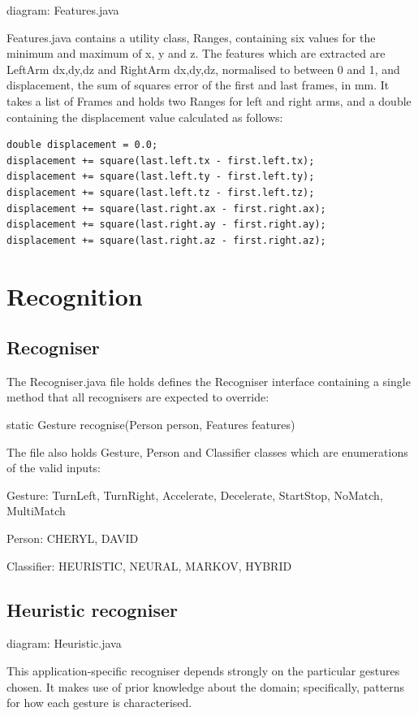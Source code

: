 \documentclass[12pt,a4,notitlepage]{report}
\renewcommand{\_}{\texttt{\symbol{95}}}
\newcommand{\<}{\texttt{\symbol{60}}}
\renewcommand{\>}{\texttt{\symbol{62}}}
\begin{document}
{diagram: Features.java}

Features.java contains a utility class, Ranges, containing six values for the minimum and maximum of x, y and z. The features which are extracted are LeftArm {dx,dy,dz} and RightArm {dx,dy,dz}, normalised to between 0 and 1, and displacement, the sum of squares error of the first and last frames, in mm. It takes a list of Frames and holds two Ranges for left and right arms, and a double containing the displacement value calculated as follows:

\begin{verbatim}
double displacement = 0.0;
displacement += square(last.left.tx - first.left.tx);
displacement += square(last.left.ty - first.left.ty);
displacement += square(last.left.tz - first.left.tz);
displacement += square(last.right.ax - first.right.ax);
displacement += square(last.right.ay - first.right.ay);
displacement += square(last.right.az - first.right.az);
\end{verbatim}

\section{Recognition}

\subsection{Recogniser}

The Recogniser.java file holds defines the Recogniser interface containing a single method that all recognisers are expected to override:

static Gesture recognise(Person person, Features features)

The file also holds Gesture, Person and Classifier classes which are enumerations of the valid inputs:

Gesture: TurnLeft, TurnRight, Accelerate, Decelerate, StartStop, NoMatch, MultiMatch

Person: CHERYL, DAVID

Classifier: HEURISTIC, NEURAL, MARKOV, HYBRID

\subsection{Heuristic recogniser}

{diagram: Heuristic.java}

This application-specific recogniser depends strongly on the particular gestures chosen. It makes use of prior knowledge about the domain; specifically, patterns for how each gesture is characterised.
\end{document}
